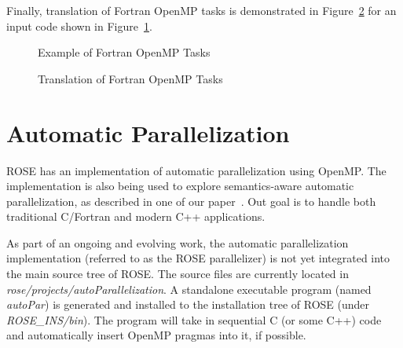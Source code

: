 \clearpage
Finally, translation of Fortran OpenMP tasks
is demonstrated in
Figure~\ref{Manual:omp:task-trans-f} for an input code shown in
Figure~\ref{Manual:omp:task-f}. 

\lstset{language=Fortran,basicstyle=\scriptsize}
\lstset{language=Fortran,basicstyle=\scriptsize,numbers=left}
\begin{figure}[htbp]
{\indent
  {\mySmallFontSize
    \begin{latexonly}
    
    \end{latexonly}
    \begin{htmlonly}
    
    \end{htmlonly}
  }
}
\caption{Example of Fortran OpenMP Tasks}
\label{Manual:omp:task-f}
\end{figure}

\begin{figure}[htbp]
{\indent
  {\mySmallFontSize
    \begin{latexonly}
    
    \end{latexonly}
    \begin{htmlonly}
    
    \end{htmlonly}
  }
}
\caption{Translation of Fortran OpenMP Tasks}
\label{Manual:omp:task-trans-f}
\end{figure}


\clearpage
\section{Automatic Parallelization}
ROSE has an implementation of automatic parallelization using OpenMP.
The implementation is also being used to explore semantics-aware automatic parallelization, as
described in one of our paper~\cite{LiaoExtending2009}.
Out goal is to handle both traditional C/Fortran and modern C++
applications.

As part of an ongoing and evolving work, the automatic parallelization
implementation (referred to as the ROSE parallelizer) is not yet integrated into the main
source tree of ROSE. 
The source files are currently located in
\textit{rose/projects/autoParallelization}.
A standalone executable program (named \textit{autoPar}) is generated and
installed to the installation tree of ROSE (under \textit{ROSE\_INS/bin}). 
The program will take in sequential C (or some C++) code and automatically
insert OpenMP pragmas into it, if possible. 

